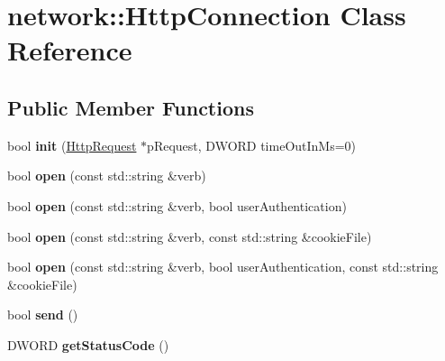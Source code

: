 \hypertarget{classnetwork_1_1HttpConnection}{}\section{network\+:\+:Http\+Connection Class Reference}
\label{classnetwork_1_1HttpConnection}
\subsection*{Public Member Functions}
\begin{DoxyCompactItemize}
\item 
\mbox{\label{classnetwork_1_1HttpConnection_a3c47f7ed0a7668c1ef9b959d7b9e6575}} 
bool {\bfseries init} (\hyperlink{classnetwork_1_1HttpRequest}{Http\+Request} $\ast$p\+Request, D\+W\+O\+RD time\+Out\+In\+Ms=0)
\item 
\mbox{\label{classnetwork_1_1HttpConnection_afbb0babb7fb7b686417035f7c3c1c927}} 
bool {\bfseries open} (const std\+::string \&verb)
\item 
\mbox{\label{classnetwork_1_1HttpConnection_aa1fea071579664f56e7f138ec83fa8e4}} 
bool {\bfseries open} (const std\+::string \&verb, bool user\+Authentication)
\item 
\mbox{\label{classnetwork_1_1HttpConnection_a97b0931a617edfb0d3c35d25c952a102}} 
bool {\bfseries open} (const std\+::string \&verb, const std\+::string \&cookie\+File)
\item 
\mbox{\label{classnetwork_1_1HttpConnection_ab3b51b149ad8086f5924c1c99175d235}} 
bool {\bfseries open} (const std\+::string \&verb, bool user\+Authentication, const std\+::string \&cookie\+File)
\item 
\mbox{\label{classnetwork_1_1HttpConnection_a8987f7c75e00991ad41198696615a9e7}} 
bool {\bfseries send} ()
\item 
\mbox{\label{classnetwork_1_1HttpConnection_ab5eef7ca5cd1e5c05158d493613eb61a}} 
D\+W\+O\+RD {\bfseries get\+Status\+Code} ()

\end{DoxyCompactItemize}
